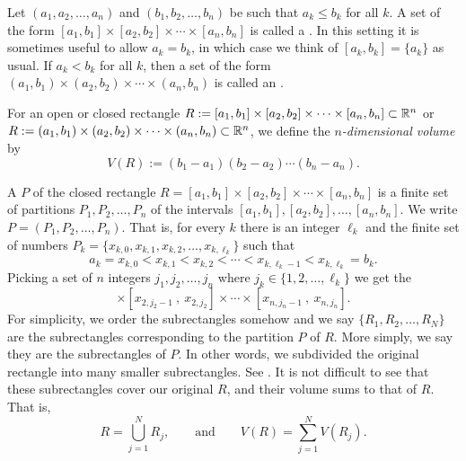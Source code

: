 \begin{defn}
Let $(a_1,a_2,\ldots,a_n)$ and
$(b_1,b_2,\ldots,b_n)$ be such that $a_k \leq b_k$ for all $k$.
A set of the form
$[a_1,b_1] \times
[a_2,b_2] \times \cdots \times
[a_n,b_n]$ is called a \emph{}.
In this setting it is sometimes useful to allow $a_k = b_k$, in which case we 
think of $[a_k,b_k] = \{ a_k \}$ as usual.
If $a_k < b_k$ for all $k$, then a set of the form
$(a_1,b_1) \times
(a_2,b_2) \times \cdots \times
(a_n,b_n)$ is called an \emph{}.

For an open or closed rectangle
$R := [a_1,b_1] \times
[a_2,b_2] \times \cdots \times
[a_n,b_n] \subset {\mathbb{R}}^n$
or
$R := (a_1,b_1) \times
(a_2,b_2) \times \cdots \times
(a_n,b_n) \subset {\mathbb{R}}^n$,
we define the
\emph{$n$-dimensional volume}%
%
 by
\begin{equation*}
V(R) :=
(b_1-a_1)
(b_2-a_2)
\cdots
(b_n-a_n) .
\end{equation*}

A \emph{} $P$ of the closed rectangle
$R = [a_1,b_1] \times
[a_2,b_2] \times \cdots \times
[a_n,b_n]$
is
a finite set of 
partitions $P_1,P_2,\ldots,P_n$ of the intervals
$[a_1,b_1], [a_2,b_2],\ldots, [a_n,b_n]$.
We write $P=(P_1,P_2,\ldots,P_n)$.
That is, for every $k$ there is an integer $\ell_k$ and the finite set
of numbers
$P_k = \{ x_{k,0},x_{k,1},x_{k,2},\ldots,x_{k,\ell_k} \}$ such that
\begin{equation*}
a_k = x_{k,0} < x_{k,1} < x_{k,2} < \cdots < x_{k,{\ell_k}-1} < x_{k,\ell_k} = b_k .
\end{equation*}
Picking a set of $n$ integers $j_1,j_2,\ldots,j_n$ where
$j_k \in \{ 1,2,\ldots,\ell_k \}$ we get
the
\emph{}
\begin{equation*}
[x_{1,j_1-1}~,~ x_{1,j_1}]
\times
[x_{2,j_2-1}~,~ x_{2,j_2}]
\times
\cdots
\times
[x_{n,j_n-1}~,~ x_{n,j_n}] .
\end{equation*}
For simplicity, we order the subrectangles somehow and
we say $\{R_1,R_2,\ldots,R_N\}$ are the subrectangles corresponding
to the partition $P$ of $R$.  More simply, we say they are the subrectangles of
$P$.
In other words, we subdivided the original rectangle into many smaller
subrectangles.  See .  It is not difficult to see that
these subrectangles cover our original $R$, and their
volume sums to that of $R$.  That is,
\begin{equation*}
R= \bigcup_{j=1}^N R_j , \qquad \text{and} \qquad
V(R) = \sum_{j=1}^N V(R_j).
\end{equation*}


\end{defn}
